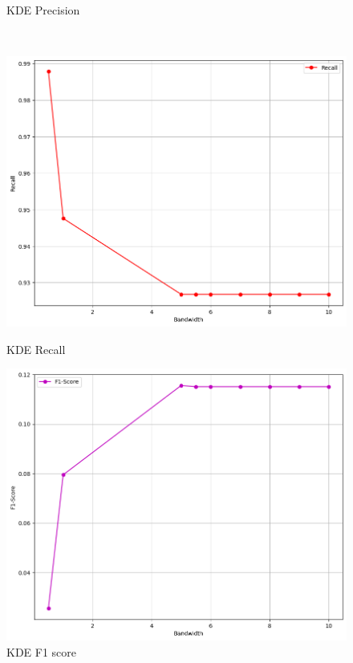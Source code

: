 \begin{figure}[p]
\begin{minipage}[t]{0.5\textwidth}
        \caption{KDE Precision}
    \end{minipage}
    \\
    \begin{minipage}[t]{0.5\textwidth}
        \vspace{0pt}
        \includegraphics[width=\textwidth]{images/kde-recall.png}
        \caption{KDE Recall}
    \end{minipage}
    \hfill
    \begin{minipage}[t]{0.5\textwidth}
        \vspace{0pt}
        \includegraphics[width=\textwidth]{images/kde-f1-score.png}
        \caption{KDE F1 score}
    \end{minipage}
\end{figure}

